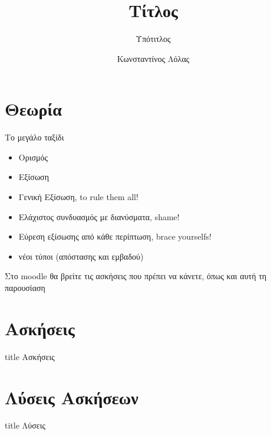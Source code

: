 \documentclass{presentation}
\title{Τίτλος}
\subtitle{Υπότιτλος}
\author[Λόλας]{Κωνσταντίνος Λόλας}
\institute[$10^ο$ ΓΕΛ]{$10^ο$ ΓΕΛ Θεσσαλονίκης}
\date{}
\begin{document}
\begin{frame}
  \titlepage
\end{frame}

\section{Θεωρία}
\begin{frame}{Το μεγάλο ταξίδι}
  \begin{itemize}[<+-|alert@+>]
    \item Ορισμός
    \item Εξίσωση
    \item Γενική Εξίσωση, to rule them all!
    \item Ελάχιστος συνδυασμός με διανύσματα, shame!
    \item Εύρεση εξίσωσης από κάθε περίπτωση, brace yourselfs!
    \item νέοι τύποι (απόστασης και εμβαδού)
  \end{itemize}
\end{frame}

\begin{frame}[noframenumbering]
  Στο moodle θα βρείτε τις ασκήσεις που πρέπει να κάνετε, όπως και αυτή τη παρουσίαση
\end{frame}

\section{Ασκήσεις}

\begin{frame}[noframenumbering]
  \vfill
  \centering
  \begin{beamercolorbox}[sep=8pt,center,shadow=true,rounded=true]{title}
    Ασκήσεις
  \end{beamercolorbox}
  \vfill
\end{frame}

\begin{askisi}

\end{askisi}

\appendix
\section*{Λύσεις Ασκήσεων}

\begin{frame}[noframenumbering]
  \vfill
  \centering
  \begin{beamercolorbox}[sep=8pt,center,shadow=true,rounded=true]{title}
    Λύσεις
  \end{beamercolorbox}
  \vfill
\end{frame}
\end{document}
